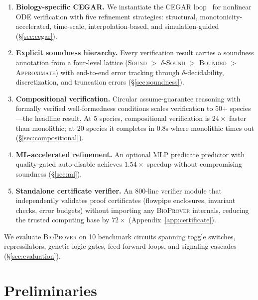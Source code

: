 \documentclass[11pt]{article}
\newcommand{\bioprover}{\textsc{BioProver}}
\newcommand{\cegar}{\textsc{CEGAR}}
\begin{document}
\begin{enumerate}[leftmargin=*,itemsep=2pt]
\item \textbf{Biology-specific \cegar{}.} We instantiate the \cegar{}
  loop~\cite{clarke2000cegar} for nonlinear ODE verification with
  five refinement strategies: structural, monotonicity-accelerated,
  time-scale, interpolation-based, and simulation-guided
  (\S\ref{sec:cegar}).

\item \textbf{Explicit soundness hierarchy.} Every verification
  result carries a soundness annotation from a four-level lattice
  (\textsc{Sound} $>$ \textsc{$\delta$-Sound} $>$ \textsc{Bounded}
  $>$ \textsc{Approximate}) with end-to-end error tracking through
  $\delta$-decidability, discretization, and truncation errors
  (\S\ref{sec:soundness}).

\item \textbf{Compositional verification.} Circular assume-guarantee
  reasoning with formally verified well-formedness conditions scales
  verification to 50+ species---the headline result. At 5 species,
  compositional verification is $24\times$ faster than monolithic;
  at 20 species it completes in 0.8s where monolithic times out
  (\S\ref{sec:compositional}).

\item \textbf{ML-accelerated refinement.} An optional MLP predicate
  predictor with quality-gated auto-disable achieves $1.54\times$
  speedup without compromising soundness (\S\ref{sec:ml}).

\item \textbf{Standalone certificate verifier.} An 800-line verifier
  module that independently validates proof certificates (flowpipe
  enclosures, invariant checks, error budgets) without importing any
  \bioprover{} internals, reducing the trusted computing base by
  $72\times$ (Appendix~\ref{app:certificate}).
\end{enumerate}

\noindent We evaluate \bioprover{} on 10 benchmark circuits spanning
toggle switches, repressilators, genetic logic gates,
feed-forward loops, and signaling cascades
(\S\ref{sec:evaluation}).

\section{Preliminaries}
\label{sec:prelim}
\end{document}

